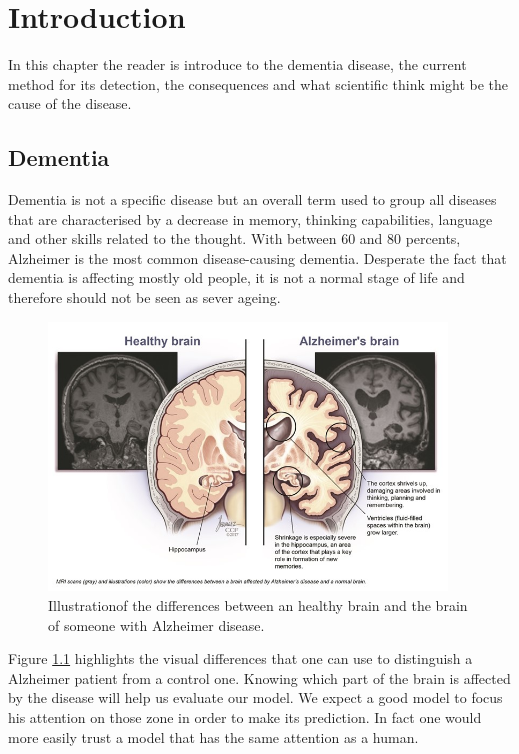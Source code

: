 \chapter{Introduction}
In this chapter the reader is introduce to the dementia disease, the current method for its detection, the consequences and what scientific think might be the cause of the disease. 

\section{Dementia}

Dementia is not a specific disease but an overall term used to group all diseases that are characterised by a decrease in memory, thinking capabilities, language and other skills related to the thought. With between 60 and 80 percents, Alzheimer is the most common disease-causing dementia. Desperate the fact that dementia is affecting mostly old people, it is not a normal stage of life and therefore should not be seen as sever ageing. 

\begin{figure}
 \centering
 \includegraphics[width=400]{figures/Alzheimer_brain.jpg}
 \caption[Test]{Illustration\footnotemark of the differences between an healthy brain and the brain of someone with Alzheimer disease.}
 \label{fig:alzheimerbrain}
\end{figure}

Figure \ref{fig:alzheimerbrain} highlights the visual differences that one can use to distinguish a Alzheimer patient from a control one. Knowing which part of the brain is affected by the disease will help us evaluate our model. We expect a good model to focus his attention on those zone in order to make its prediction. In fact one would more easily trust a model that has the same attention as a human.

